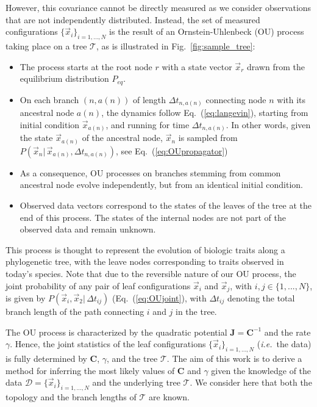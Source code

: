 \documentclass[preprint,amsmath,amssymb,superscriptaddress,showpacs,pre]{revtex4-1}
\newcommand{\ie}{\emph{i.e.}}
\def\vx{\vec x}
\begin{document}
However, this covariance cannot be directly measured as we consider observations that are not independently distributed.
Instead, the set of measured configurations $\{\vx_i\}_{i=1,...,N}$ is the result of an Ornstein-Uhlenbeck (OU) process taking place on a tree $\mathcal{T}$, as is illustrated in Fig.~\ref{fig:sample_tree}:
\begin{itemize}
    \item The process starts at the root node $r$ with a state vector $\vx_r$ drawn from the equilibrium distribution $P_{eq}$.
    \item On each branch $(n,a(n))$ of length $\Delta t_{n,a(n)}$ connecting node $n$ with its ancestral node $a(n)$, the dynamics follow Eq.~(\ref{eq:langevin}), starting from initial condition $\vx_{a(n)}$, and running for time $\Delta t_{n,a(n)}$. In other words, given the state $\vx_{a(n)}$ of the ancestral node, $\vx_n$ is sampled from $P(\vx_n |\, \vx_{a(n)}, \Delta t_{n,a(n)})$, see Eq.~(\ref{eq:OUpropagator})
    \item As a consequence, OU processes on branches stemming from common ancestral node evolve independently, but from an identical initial condition.
    \item Observed data vectors correspond to the states of the leaves of the tree at the end of this process. The states of the internal nodes are not part of the observed data and remain unknown. 
\end{itemize}
This process is thought to represent the evolution of biologic traits along a phylogenetic tree, with the leave nodes corresponding to traits observed in today's species. Note that due to the reversible nature of our OU process, the joint probability of any pair of leaf configurations $\vx_i$ and $\vx_j$, with $i,j\in\{1,...,N\}$, is given by  $P(\vx_i,\vx_2|\,\Delta t_{ij})$ (Eq.~(\ref{eq:OUjoint}), with $\Delta t_{ij}$ denoting the total branch length of the path connecting $i$ and $j$ in the tree.

The OU process is characterized by the quadratic potential $\bm J = \bm C^{-1}$ and the rate $\gamma$. 
Hence, the joint statistics of the leaf configurations $\{\vx_i\}_{i=1,...,N}$ (\ie~the data) is fully determined by $\bm C$, $\gamma$, and the tree $\mathcal{T}$. 
The aim of this work is to derive a method for inferring the most likely values of $\bm C$ and $\gamma$ given the knowledge of the data $\mathcal{D}=\{\vx_i\}_{i=1,...,N}$ and the underlying tree $\mathcal{T}$. We consider here that both the topology and the branch lengths of $\mathcal{T}$ are known. 
\end{document}
